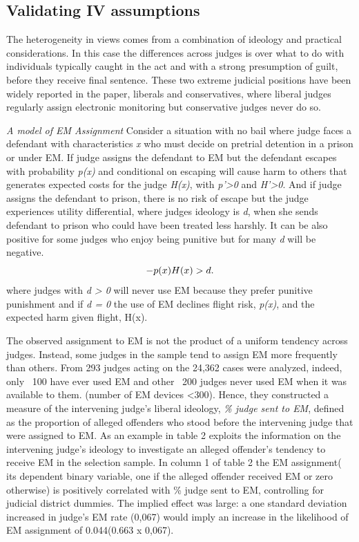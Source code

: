 \documentclass[a4paper,12pt]{article}
\begin{document}
\subsection{Validating IV assumptions}
The heterogeneity in views comes from a combination of ideology and practical considerations. In this case the differences across judges is over what to do with individuals typically caught in the act and with a strong presumption of guilt, before they receive final sentence. These two extreme judicial positions have been widely reported in the paper, liberals and conservatives, where liberal judges regularly assign electronic monitoring but conservative judges never do so. 

\textit{A model of EM Assignment}
Consider a situation with no bail where judge faces a defendant with characteristics \textit{x} who must decide on pretrial detention in a prison or under EM. If judge assigns the defendant to EM but the defendant escapes with probability \textit{p(x)} and conditional on escaping will cause harm to others that generates expected costs for the judge \textit{H(x)}, with \textit{p'>0} and \textit{H'>0}. And if judge assigns the defendant to prison, there is no risk of escape but the judge experiences utility differential, where judges ideology is \textit{d}, when she sends defendant to prison who could have been treated less harshly. It can be also positive for some judges who enjoy being punitive but for many \textit{d} will be negative. 
\begin{equation}
    \centering
    - p(x)H(x) > d.
\end{equation}
where judges with \textit{d > 0} will never use EM because they prefer punitive punishment and if \textit{d = 0} the use of EM declines flight risk, \textit{p(x)}, and the expected harm given flight, H(x).  

The observed assignment to EM is not the product of a uniform tendency across judges. Instead, some judges in the sample tend to assign EM more frequently than others. From 293 judges acting on the 24,362 cases were analyzed, indeed, only ~100 have ever used EM and other ~200 judges never used EM when it was available to them. (number of EM devices <300). Hence, they constructed a measure of the intervening judge's liberal ideology, \textit{ \% judge sent to EM}, defined as the proportion of alleged offenders who stood before the intervening judge that were assigned to EM. 
As an example in table 2 exploits the information on the intervening judge's ideology to investigate an alleged offender's tendency to receive EM in the selection sample. In column 1 of table 2 the EM assignment( its dependent binary variable, one if the alleged offender received EM or zero otherwise) is positively correlated with \% judge sent to EM, controlling for judicial district dummies. The implied effect was large: a one standard deviation increased in judge's EM rate (0,067) would imply an increase in the likelihood of EM assignment of 0.044(0.663 x 0,067). 
\end{document}
